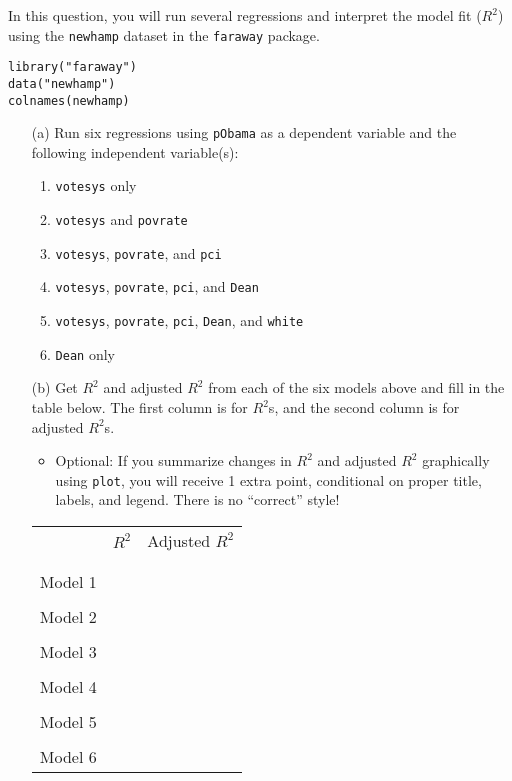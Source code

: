 \documentclass[12pt,letterpaper]{article}
\begin{document}
In this question, you will run several regressions and interpret the model fit ($R^2$) using the \texttt{newhamp} dataset in the \texttt{faraway} package.

\begin{verbatim}
library("faraway")
data("newhamp")
colnames(newhamp)
\end{verbatim}

\begin{enumerate}
	
\item [(a)] Run six regressions using \texttt{pObama} as a dependent variable and the following independent variable(s):
	\begin{enumerate}
		\item \texttt{votesys} only
		\item \texttt{votesys} and \texttt{povrate}
		\item \texttt{votesys}, \texttt{povrate}, and \texttt{pci}
		\item \texttt{votesys}, \texttt{povrate}, \texttt{pci}, and \texttt{Dean}
		\item \texttt{votesys}, \texttt{povrate}, \texttt{pci}, \texttt{Dean}, and \texttt{white}
		\item \texttt{Dean} only
	\end{enumerate}
	
\newpage	
\item [(b)] Get $R^2$ and adjusted $R^2$ from each of the six models above and fill in the table below. The first column is for $R^2$s, and the second column is for adjusted $R^2$s.
	\begin{itemize}
		\item Optional: If you summarize changes in $R^2$ and adjusted $R^2$ graphically using \texttt{plot}, you will receive 1 extra point, conditional on proper title, labels, and legend. There is no ``correct'' style!
	\end{itemize}
	
	\begin{table}[!h] \centering 
			\centering
		\begin{tabular}{lcc}
				& $R^2$ & Adjusted $R^2$ \\ 
	\\[-1.8ex] 
\hline \\[-1.8ex]
			Model 1 & \hspace{6cm} &  \\ 
			\\
			Model 2 \\
			\\
			Model 3 \\
			\\
			Model 4  \\
			\\
			Model 5 \\
			\\
			Model 6 \\
		\hline 
\end{tabular} 
\end{table}
	

\end{enumerate}
\end{document}
